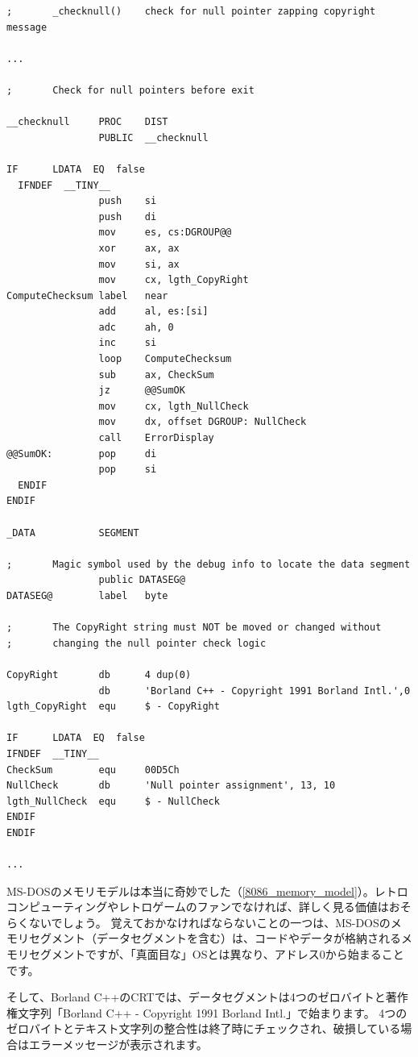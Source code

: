 \begin{lstlisting}[style=customasmx86]
;       _checknull()    check for null pointer zapping copyright message

...

;       Check for null pointers before exit

__checknull     PROC    DIST
                PUBLIC  __checknull

IF      LDATA  EQ  false
  IFNDEF  __TINY__
                push    si
                push    di
                mov     es, cs:DGROUP@@
                xor     ax, ax
                mov     si, ax
                mov     cx, lgth_CopyRight
ComputeChecksum label   near
                add     al, es:[si]
                adc     ah, 0
                inc     si
                loop    ComputeChecksum
                sub     ax, CheckSum
                jz      @@SumOK
                mov     cx, lgth_NullCheck
                mov     dx, offset DGROUP: NullCheck
                call    ErrorDisplay
@@SumOK:        pop     di
                pop     si
  ENDIF
ENDIF

_DATA           SEGMENT

;       Magic symbol used by the debug info to locate the data segment
                public DATASEG@
DATASEG@        label   byte

;       The CopyRight string must NOT be moved or changed without
;       changing the null pointer check logic

CopyRight       db      4 dup(0)
                db      'Borland C++ - Copyright 1991 Borland Intl.',0
lgth_CopyRight  equ     $ - CopyRight

IF      LDATA  EQ  false
IFNDEF  __TINY__
CheckSum        equ     00D5Ch
NullCheck       db      'Null pointer assignment', 13, 10
lgth_NullCheck  equ     $ - NullCheck
ENDIF
ENDIF

...

\end{lstlisting}

MS-DOSのメモリモデルは本当に奇妙でした（\ref{8086_memory_model}）。レトロコンピューティングやレトロゲームのファンでなければ、詳しく見る価値はおそらくないでしょう。
覚えておかなければならないことの一つは、MS-DOSのメモリセグメント（データセグメントを含む）は、コードやデータが格納されるメモリセグメントですが、「真面目な」\ac{OS}とは異なり、アドレス0から始まることです。

そして、Borland C++の\ac{CRT}では、データセグメントは4つのゼロバイトと著作権文字列「Borland C++ - Copyright 1991 Borland Intl.」で始まります。
4つのゼロバイトとテキスト文字列の整合性は終了時にチェックされ、破損している場合はエラーメッセージが表示されます。

